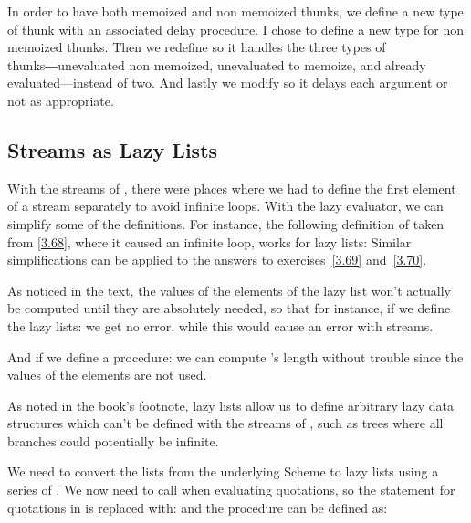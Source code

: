 \begin{exe}[4.31]
    In order to have both memoized and non memoized thunks, we define a new type 
    of thunk with an associated delay procedure. I chose to define a new type 
    for non memoized thunks. Then we redefine  so it handles the 
    three types of thunks―unevaluated non memoized, unevaluated to memoize, and 
    already evaluated—instead of two. And lastly we modify  so it 
    delays each argument or not as appropriate.
\end{exe}

\subsection{Streams as Lazy Lists}

\begin{exe}[4.32]
    With the streams of , there were places where we had to define 
    the first element of a stream separately to avoid infinite loops. With the 
    lazy evaluator, we can simplify some of the definitions. For instance, the 
    following definition of  taken from \autoref{3.68}, where it 
    caused an infinite loop, works for lazy lists:
    Similar simplifications can be applied to the answers to 
    exercises~\ref{3.69} and~\ref{3.70}.

    \medskip

    As noticed in the text, the values of the elements of the lazy list won’t 
    actually be computed until they are absolutely needed, so that for instance, 
    if we define the lazy lists:
    we get no error, while this would cause an error with streams.

    \medskip

    And if we define a  procedure:
    we can compute ’s length without trouble since the values of the 
    elements are not used.

    \medskip

    As noted in the book’s footnote, lazy lists allow us to define arbitrary 
    lazy data structures which can’t be defined with the streams of 
    , such as trees where all branches could potentially be 
    infinite.
\end{exe}

\begin{exe}[4.33]
    We need to convert the lists from the underlying Scheme to lazy lists using 
    a series of . We now need to call  when evaluating 
    quotations, so the statement for quotations in  is replaced with:
    and the  procedure can be defined as:
\end{exe}

